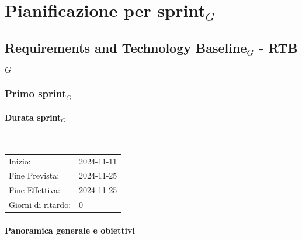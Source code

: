 \documentclass[10pt]{article}
\begin{document}
{\newpage


\section{Pianificazione per sprint$_G$}
\label{pianificazione}

\subsection{Requirements and Technology Baseline$_G$ - RTB$_G$}


\subsubsection{Primo sprint$_G$}
\label{primo-sprint$_G$}
    
    \paragraph{Durata sprint$_G$}\mbox{}\\
    \vspace{-1.5em}
    \begin{table}[h] 
    \renewcommand{\arraystretch}{1.2}  
    \begin{tabular}{ l l }
        Inizio: & 2024-11-11 \\
        Fine Prevista: & 2024-11-25 \\
        Fine Effettiva: & 2024-11-25 \\
        Giorni di ritardo: & 0 \\
    \end{tabular}
    \end{table}
    \vspace{-2em}
    {\renewcommand{\arraystretch}{1.5}%
    
    \paragraph{Panoramica generale e obiettivi}\mbox{}\vspace{0.4em}
    
}}
\end{document}
